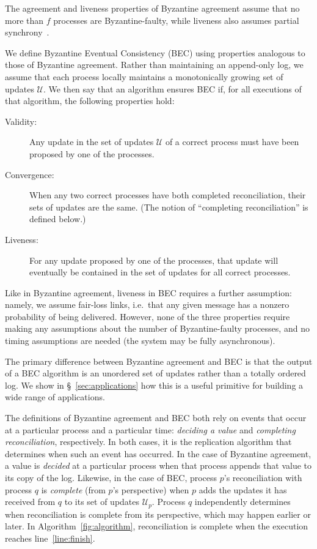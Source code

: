 \documentclass[a4paper,anonymous,USenglish]{lipics-v2019}
\begin{document}
The agreement and liveness properties of Byzantine agreement assume that no more than $f$ processes are Byzantine-faulty, while liveness also assumes partial synchrony~\cite{Dwork:1988}.

We define Byzantine Eventual Consistency (BEC) using properties analogous to those of Byzantine agreement.
Rather than maintaining an append-only log, we assume that each process locally maintains a monotonically growing set of updates $\mathcal{U}$.
We then say that an algorithm ensures BEC if, for all executions of that algorithm, the following properties hold:

\begin{description}
\item[Validity:] Any update in the set of updates $\mathcal{U}$ of a correct process must have been proposed by one of the processes.
\item[Convergence:] When any two correct processes have both completed reconciliation, their sets of updates are the same. (The notion of ``completing reconciliation'' is defined below.)
\item[Liveness:] For any update proposed by one of the processes, that update will eventually be contained in the set of updates for all correct processes.
\end{description}

Like in Byzantine agreement, liveness in BEC requires a further assumption: namely, we assume fair-loss links, i.e.\ that any given message has a nonzero probability of being delivered.
However, none of the three properties require making any assumptions about the number of Byzantine-faulty processes, and no timing assumptions are needed (the system may be fully asynchronous).

The primary difference between Byzantine agreement and BEC is that the output of a BEC algorithm is an unordered set of updates rather than a totally ordered log.
We show in \S~\ref{sec:applications} how this is a useful primitive for building a wide range of applications.

The definitions of Byzantine agreement and BEC both rely on events that occur at a particular process and a particular time: \emph{deciding a value} and \emph{completing reconciliation}, respectively.
In both cases, it is the replication algorithm that determines when such an event has occurred.
In the case of Byzantine agreement, a value is \emph{decided} at a particular process when that process appends that value to its copy of the log.
Likewise, in the case of BEC, process $p$'s reconciliation with process $q$ is \emph{complete} (from $p$'s perspective) when $p$ adds the updates it has received from $q$ to its set of updates $\mathcal{U}_p$.
Process $q$ independently determines when reconciliation is complete from its perspective, which may happen earlier or later.
In Algorithm~\ref{fig:algorithm}, reconciliation is complete when the execution reaches line~\ref{line:finish}.
\end{document}
